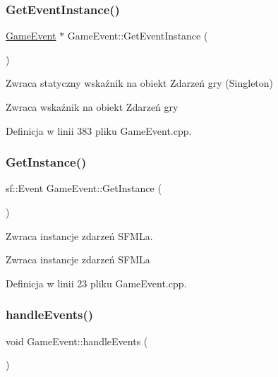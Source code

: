 \subsubsection{\texorpdfstring{Get\+Event\+Instance()}{GetEventInstance()}}
{\footnotesize\ttfamily \mbox{\hyperlink{class_game_event}{Game\+Event}} $\ast$ Game\+Event\+::\+Get\+Event\+Instance (\begin{DoxyParamCaption}{ }\end{DoxyParamCaption})\hspace{0.3cm}{\ttfamily [static]}}



Zwraca statyczny wskaźnik na obiekt Zdarzeń gry (Singleton) 

\begin{DoxyReturn}{Zwraca}
wskaźnik na obiekt Zdarzeń gry 
\end{DoxyReturn}


Definicja w linii 383 pliku Game\+Event.\+cpp.

\mbox{\label{class_game_event_adbf21138a4eb40624a0f40b2ff75f6db}} 
\subsubsection{\texorpdfstring{Get\+Instance()}{GetInstance()}}
{\footnotesize\ttfamily sf\+::\+Event Game\+Event\+::\+Get\+Instance (\begin{DoxyParamCaption}{ }\end{DoxyParamCaption})}



Zwraca instancje zdarzeń S\+F\+ML\textquotesingle{}a. 

\begin{DoxyReturn}{Zwraca}
instancje zdarzeń S\+F\+ML\textquotesingle{}a 
\end{DoxyReturn}


Definicja w linii 23 pliku Game\+Event.\+cpp.

\mbox{\label{class_game_event_a73a56d31069079123f03f20855cb9bf0}} 
\subsubsection{\texorpdfstring{handle\+Events()}{handleEvents()}}
{\footnotesize\ttfamily void Game\+Event\+::handle\+Events (\begin{DoxyParamCaption}{ }\end{DoxyParamCaption})}



